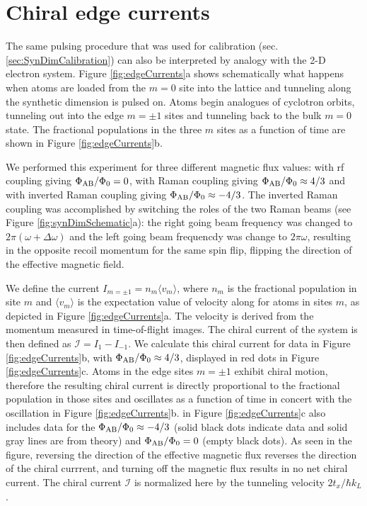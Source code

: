 \section{Chiral edge currents}

The same pulsing procedure that was used for calibration (sec. \ref{sec:SynDimCalibration}) can also be interpreted by analogy with the 2-D electron system. Figure \ref{fig:edgeCurrents}a shows schematically what happens when atoms are loaded from the $m=0$ site into the lattice and tunneling along the synthetic dimension is pulsed on. Atoms begin analogues of cyclotron orbits, tunneling out into the edge $m=\pm1$ sites and tunneling back to the  bulk $m=0$ state. The fractional populations in the three $m$ sites as a function of time are shown in Figure \ref{fig:edgeCurrents}b. 

We performed this experiment for three different magnetic flux values: with rf coupling giving $\Phi_{\rm AB}/\Phi_0=0$, with Raman coupling giving $\Phi_{\rm AB}/\Phi_0\approx4/3$ and with inverted Raman coupling giving $\Phi_{\rm AB}/\Phi_0\approx-4/3$.
The inverted Raman coupling was accomplished by switching the roles of the two Raman beams (see Figure \ref{fig:synDimSchematic}a): the right going beam frequency was changed to $2\pi (\omega + \Delta\omega)$ and the left going beam frequencdy was change to $2\pi\omega$, resulting in the opposite recoil momentum for the same spin flip, flipping the direction of the effective magnetic field. 

We  define the current $I_{m=\pm1}=n_m \langle v_m \rangle$, where $n_m$ is the fractional population in site $m$ and $\langle v_m \rangle$ is the expectation value of velocity along \ex{} for atoms in sites $m$, as depicted in Figure \ref{fig:edgeCurrents}a. The velocity is derived from the momentum measured in time-of-flight images. The chiral current of the system is then defined as $\mathcal{I}=I_1-I_{-1}$. We calculate this chiral current for data in  Figure \ref{fig:edgeCurrents}b, with $\Phi_{\rm AB}/\Phi_0\approx4/3$, displayed in red dots in Figure \ref{fig:edgeCurrents}c. Atoms in the edge sites $m=\pm1$ exhibit chiral motion, therefore the resulting chiral current is directly proportional to the fractional population in those sites and oscillates as a function of time in concert with the oscillation in Figure \ref{fig:edgeCurrents}b. in Figure \ref{fig:edgeCurrents}c also includes data for the $\Phi_{\rm AB}/\Phi_0\approx-4/3$ (solid black dots indicate data and solid gray lines are from theory) and $\Phi_{\rm AB}/\Phi_0=0$ (empty black dots). As seen in the figure, reversing the direction of the effective magnetic flux reverses the direction of the chiral currrent, and turning off the magnetic flux results in no net chiral current. The chiral current $\mathcal{I}$ is normalized here by the tunneling velocity $2 t_x/\hbar k_L$. 

